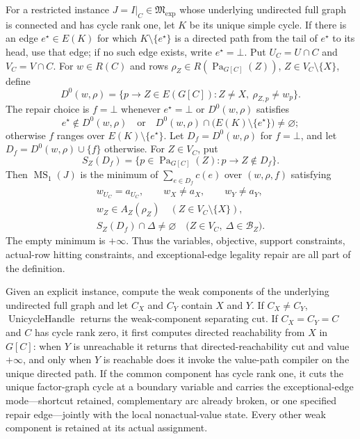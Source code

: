 For a restricted instance \(J=I|_C\in\mathfrak M_{\mathrm{exp}}\) whose underlying undirected full graph is connected and has cycle rank one, let \(K\) be its unique simple cycle.  If there is an edge \(e^\star\in E(K)\) for which \(K\setminus\{e^\star\}\) is a directed path from the tail of \(e^\star\) to its head, use that edge; if no such edge exists, write \(e^\star=\bot\).  Put \(U_C=U\cap C\) and \(V_C=V\cap C\).  For \(w\in R(C)\) and rows \(\rho_Z\in R(\operatorname{Pa}_{G[C]}(Z))\), \(Z\in V_C\setminus\{X\}\), define
\[
 D^0(w,\rho)=\{p\to Z\in E(G[C]):Z\ne X,\ \rho_{Z,p}\ne w_p\}.
\]
The repair choice is \(f=\bot\) whenever \(e^\star=\bot\) or \(D^0(w,\rho)\) satisfies
\[
 e^\star\notin D^0(w,\rho)
 \quad\text{or}\quad
 D^0(w,\rho)\cap\bigl(E(K)\setminus\{e^\star\}\bigr)\ne\varnothing;
\]
otherwise \(f\) ranges over \(E(K)\setminus\{e^\star\}\).  Let \(D_f=D^0(w,\rho)\) for \(f=\bot\), and let \(D_f=D^0(w,\rho)\cup\{f\}\) otherwise.  For \(Z\in V_C\), put
\[
 S_Z(D_f)=\{p\in\operatorname{Pa}_{G[C]}(Z):p\to Z\notin D_f\}.
\]
Then \(\operatorname{MS}_1(J)\) is the minimum of \(\sum_{e\in D_f}c(e)\) over \((w,\rho,f)\) satisfying
\[
 \begin{gathered}
 w_{U_C}=a_{U_C},\qquad w_X\ne a_X,\qquad w_Y\ne a_Y,\\
 w_Z\in A_Z(\rho_Z)\quad(Z\in V_C\setminus\{X\}),\\
 S_Z(D_f)\cap\Delta\ne\varnothing
 \quad\bigl(Z\in V_C,\ \Delta\in\mathcal B_Z\bigr).
 \end{gathered}
\]
The empty minimum is \(+\infty\).  Thus the variables, objective, support constraints, actual-row hitting constraints, and exceptional-edge legality repair are all part of the definition.

Given an explicit instance, compute the weak components of the underlying undirected full graph and let \(C_X\) and \(C_Y\) contain \(X\) and \(Y\).  If \(C_X\ne C_Y\), \(\operatorname{UnicycleHandle}\) returns the weak-component separating cut.  If \(C_X=C_Y=C\) and \(C\) has cycle rank zero, it first computes directed reachability from \(X\) in \(G[C]\): when \(Y\) is unreachable it returns that directed-reachability cut and value \(+\infty\), and only when \(Y\) is reachable does it invoke the value-path compiler on the unique directed path.  If the common component has cycle rank one, it cuts the unique factor-graph cycle at a boundary variable and carries the exceptional-edge mode---shortcut retained, complementary arc already broken, or one specified repair edge---jointly with the local nonactual-value state.  Every other weak component is retained at its actual assignment.


